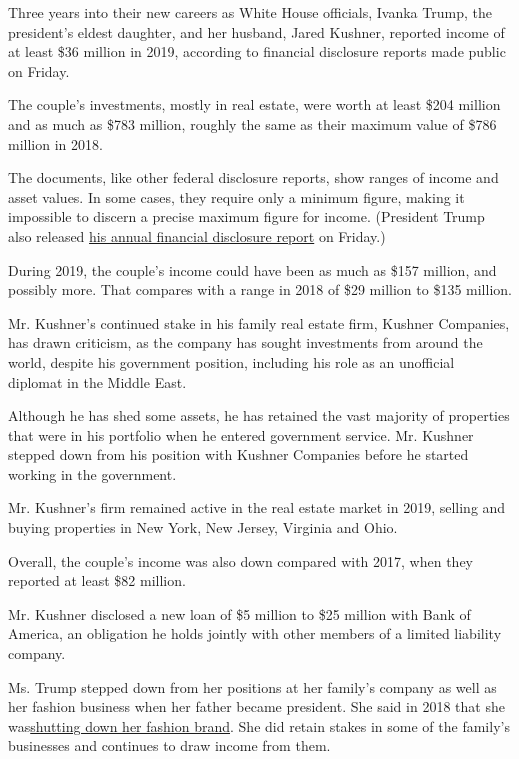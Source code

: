 Three years into their new careers as White House officials, Ivanka
Trump, the president's eldest daughter, and her husband, Jared Kushner,
reported income of at least \$36 million in 2019, according to financial
disclosure reports made public on Friday.

The couple's investments, mostly in real estate, were worth at least
\$204 million and as much as \$783 million, roughly the same as their
maximum value of \$786 million in 2018.

The documents, like other federal disclosure reports, show ranges of
income and asset values. In some cases, they require only a minimum
figure, making it impossible to discern a precise maximum figure for
income. (President Trump also released
\href{https://www.nytimes3xbfgragh.onion/2020/07/31/business/trump-financial-disclosure.html}{his
annual financial disclosure report} on Friday.)

During 2019, the couple's income could have been as much as \$157
million, and possibly more. That compares with a range in 2018 of \$29
million to \$135 million.

Mr. Kushner's continued stake in his family real estate firm, Kushner
Companies, has drawn criticism, as the company has sought investments
from around the world, despite his government position, including his
role as an unofficial diplomat in the Middle East.

Although he has shed some assets, he has retained the vast majority of
properties that were in his portfolio when he entered government
service. Mr. Kushner stepped down from his position with Kushner
Companies before he started working in the government.

Mr. Kushner's firm remained active in the real estate market in 2019,
selling and buying properties in New York, New Jersey, Virginia and
Ohio.

Overall, the couple's income was also down compared with 2017, when they
reported at least \$82 million.

Mr. Kushner disclosed a new loan of \$5 million to \$25 million with
Bank of America, an obligation he holds jointly with other members of a
limited liability company.

Ms. Trump stepped down from her positions at her family's company as
well as her fashion business when her father became president. She said
in 2018 that she
was\href{https://www.nytimes3xbfgragh.onion/2018/07/24/business/ivanka-trump-brand-clothing.html}{shutting
down her fashion brand}. She did retain stakes in some of the family's
businesses and continues to draw income from them.

